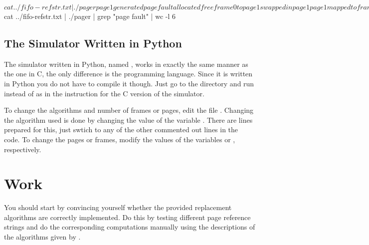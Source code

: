 \documentclass[a4paper,nocourse]{miunasgn}
\begin{document}
\begin{terminal}[float,label={lst:pager},caption={An example showing a run of 
    the simulator.
    The last page reference is out of range and causes an abort trap to the 
    operating system, resulting in a killed process.
  }]
$ cat ../fifo-refstr.txt | ./pager
page 1 generated page fault
allocated free frame 0 to page 1
swapped in page 1
page 1 mapped to frame 0
page 2 generated page fault
allocated free frame 1 to page 2
swapped in page 2
page 2 mapped to frame 1
page 3 generated page fault
allocated free frame 2 to page 3
swapped in page 3
page 3 mapped to frame 2
page 4 generated page fault
allocated free frame 3 to page 4
swapped in page 4
page 4 mapped to frame 3
page 5 generated page fault
allocated free frame 4 to page 5
swapped in page 5
page 5 mapped to frame 4
page 6 generated page fault
swapped out page 1
swapped in page 6
page 6 mapped to frame 0
page 2 mapped to frame 1
page 10 generated abort trap: process killed
$ cat ../fifo-refstr.txt | ./pager | grep "page fault" | wc -l
6
\end{terminal}

\subsection{The Simulator Written in Python}

The simulator written in Python, named , works in exactly the 
same manner as the one in C, the only difference is the programming language.
Since it is written in Python you do not have to compile it though.
Just go to the  directory and run  instead of 
 as in the instruction for the C version of the simulator.

To change the algorithms and number of frames or pages, edit the file 
.
Changing the algorithm used is done by changing the value of the variable 
.
There are lines prepared for this, just swtich to any of the other commented 
out lines in the code.
To change the pages or frames, modify the values of the variables  
or , respectively.


\section{Work}
\label{sec:Work}
You should start by convincing yourself whether the provided replacement 
algorithms are correctly implemented.
Do this by testing different page reference strings and do the corresponding 
computations manually using the descriptions of the algorithms given by 
\citet[ch.\ 9.4]{Silberschatz2009osc,Silberschatz2013osc,Silberschatz2013intl}.
\end{document}
